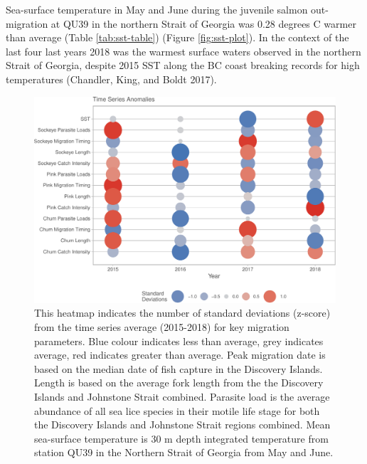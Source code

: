 \documentclass[fleqn,10pt]{wlpeerj} %
\begin{document}
Sea-surface temperature in May and June during the juvenile salmon
out-migration at QU39 in the northern Strait of Georgia was 0.28 degrees
C warmer than average (Table \ref{tab:sst-table}) (Figure
\ref{fig:sst-plot}). In the context of the last four last years 2018 was
the warmest surface waters observed in the northern Strait of Georgia,
despite 2015 SST along the BC coast breaking records for high
temperatures (Chandler, King, and Boldt 2017).

\begin{figure}[H]
\includegraphics[width=0.95\linewidth]{Migration_Observations_Report_files/figure-latex/heatmap-1} \caption{This heatmap indicates the number of standard deviations (z-score) from the time series average (2015-2018) for key migration parameters. Blue colour indicates less than average, grey indicates average, red indicates greater than average. Peak migration date is based on the median date of fish capture in the Discovery Islands. Length is based on the average fork length from the the Discovery Islands and Johnstone Strait combined. Parasite load is the average abundance of all sea lice species in their motile life stage for both the Discovery Islands and Johnstone Strait regions combined. Mean sea-surface temperature is 30 m depth integrated temperature from station QU39 in the Northern Strait of Georgia from May and June.}\label{fig:heatmap}
\end{figure}
\end{document}

